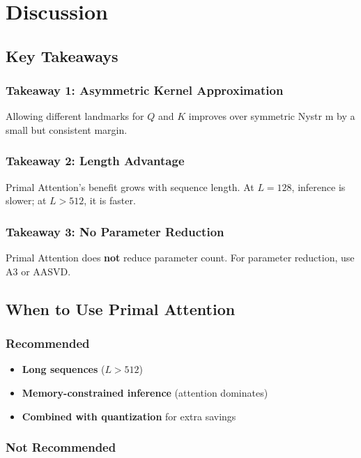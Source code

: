 
\section{Discussion}

\subsection{Key Takeaways}

\subsubsection{Takeaway 1: Asymmetric Kernel Approximation}

Allowing different landmarks for $Q$ and $K$ improves over symmetric Nystr m 
by a small but consistent margin.

\subsubsection{Takeaway 2: Length Advantage}

Primal Attention's benefit grows with sequence length. At $L = 128$, 
inference is slower; at $L > 512$, it is faster.

\subsubsection{Takeaway 3: No Parameter Reduction}

Primal Attention does \textbf{not} reduce parameter count. For parameter 
reduction, use A3 or AASVD.

\subsection{When to Use Primal Attention}

\subsubsection{Recommended}

\begin{itemize}
\item \textbf{Long sequences} ($L > 512$)
\item \textbf{Memory-constrained inference} (attention dominates)
\item \textbf{Combined with quantization} for extra savings

\end{itemize}
\subsubsection{Not Recommended}

